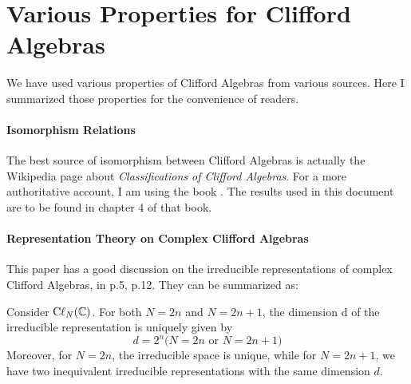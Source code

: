 \section{Various Properties for Clifford Algebras}
\label{sec:Various Properties for Clifford Algebras}
We have used various properties of Clifford Algebras from various sources. Here
I summarized those properties for the convenience of readers.

\paragraph{Isomorphism Relations}
The best source of isomorphism between Clifford Algebras is actually the
Wikipedia page about \textit{Classifications of Clifford Algebras}. For a more
authoritative account, I am using the book \cite{VazJayme2016}. The results
used in this document are to be found in chapter 4 of that book.

\paragraph{Representation Theory on Complex Clifford Algebras}
This paper \cite{West1998} has a good discussion on the irreducible
representations of complex Clifford Algebras, in p.5, p.12. They can be
summarized as:
\begin{thm}
	Consider $\mathrm{C\ell}_{N}(\mathbb{C})$. For both $N = 2n$ and $N = 2n + 1$, the
	dimension d of the irreducible representation is uniquely given by
	\begin{equation}
	d = 2^n \text{($N=2n$ or $N=2n+1$)}
	\end{equation}
	Moreover, for $N = 2n$, the irreducible space is unique, while for $N = 2n +
	1$, we have two inequivalent irreducible representations with the same
	dimension $d$.
\end{thm}

